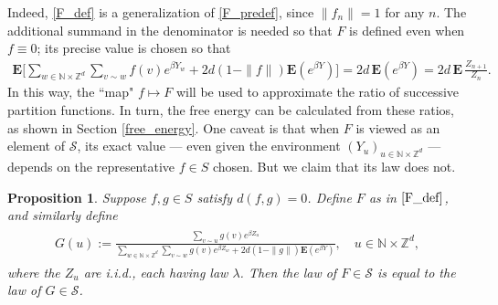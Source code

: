 \documentclass[11pt,reqno]{amsart}
\numberwithin{equation}{section}
\newtheorem{prop}[thm]{Proposition}
\theoremstyle{definition}
\begin{document}
Indeed, \eqref{F_def} is a generalization of \eqref{F_predef}, since $\|f_n\| = 1$ for any $n$.
The additional summand in the denominator is needed so that $F$ is defined even when $f \equiv 0$; its precise value is chosen so that
{\begin{align*} {
{\mathbf{E}}\Bigg[\sum_{w \in {\mathbb{N}} \times {\mathbb{Z}}^d} \sum_{v \sim w} f(v) e^{\beta Y_w} + 2d(1 - \|f\|){\mathbf{E}}(e^{\beta Y})\Bigg] = 2d\, {\mathbf{E}}(e^{\beta Y}) = 2d\, {\mathbf{E}}\, \frac{Z_{n+1}}{Z_n}.
} \end{align*}}
In this way, the ``map" $f \mapsto F$ will be used to approximate the ratio of successive partition functions.
In turn, the free energy can be calculated from these ratios, as shown in Section \ref{free_energy}.
One caveat is that when $F$ is viewed as an element of ${\mathcal{S}}$, its exact value --- even given the  environment $(Y_u)_{u \in {\mathbb{N}} \times {\mathbb{Z}}^d}$ --- depends on the representative $f \in S$ chosen. 
But we claim that its law does not.

\begin{prop} \label{same_law}
Suppose $f,g \in S$ satisfy $d(f,g) = 0$.
Define $F$ as in $\eqref{F_def}$, and similarly define
{\begin{align} \begin{split} {
G(u) := \frac{\sum_{v \sim u} g(v) e^{\beta Z_u}}{\sum_{w \in {\mathbb{N}} \times {\mathbb{Z}}^d} \sum_{v \sim w} g(v)e^{\beta Z_w} + 2d(1 - \|g\|){\mathbf{E}}(e^{\beta Y})},\quad u \in {\mathbb{N}} \times {\mathbb{Z}}^d, \label{G_def}
} \end{split} \end{align}}
where the $Z_u$ are i.i.d., each having law $\lambda$.
Then the law of $F \in {\mathcal{S}}$ is equal to the law of $G \in {\mathcal{S}}$.
\end{prop}
\end{document}

